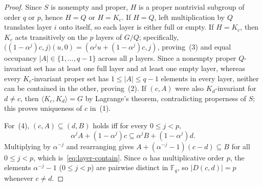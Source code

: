 \documentclass[11pt,reqno]{amsart}
\numberwithin{equation}{section}
\theoremstyle{definition}
\theoremstyle{remark}
\newcommand{\F}{\mathbb{F}}
\begin{document}
\begin{proof}
Since $S$ is nonempty and proper, $H$ is a proper nontrivial subgroup of order $q$ or $p$, hence $H=Q$ or $H=K_c$. If $H=Q$, left multiplication by $Q$ translates layer $i$ onto itself, so each layer is either full or empty. If $H=K_c$, then $K_c$ acts transitively on the $p$ layers of $G/Q$; specifically, $\bigl((1-\alpha^j)c,j\bigr)(u,0)=(\alpha^j u+(1-\alpha^j)c,j)$, proving~(3) and equal occupancy $|A|\in\{1,\ldots,q-1\}$ across all $p$ layers. Since a nonempty proper $Q$-invariant set has at least one full layer and at least one empty layer, whereas every $K_c$-invariant proper set has $1\le |A|\le q-1$ elements in every layer, neither can be contained in the other, proving~(2). If $(c,A)$ were also $K_d$-invariant for $d\neq c$, then $\langle K_c,K_d\rangle = G$ by Lagrange's theorem, contradicting properness of $S$; this proves uniqueness of $c$ in~(1).

For~(4), $(c,A)\subseteq (d,B)$ holds iff for every $0\le j<p$,
\[
\alpha^j A + (1-\alpha^j)c \subseteq \alpha^j B + (1-\alpha^j)d.
\]
Multiplying by $\alpha^{-j}$ and rearranging gives $A + (\alpha^{-j}-1)(c-d)\subseteq B$ for all $0\le j<p$, which is~\eqref{eq:layer-contain}. Since $\alpha$ has multiplicative order $p$, the elements $\alpha^{-j}-1$ ($0\le j<p$) are pairwise distinct in $\F_q$, so $|D(c,d)|=p$ whenever $c\neq d$.
\end{proof}
\end{document}

